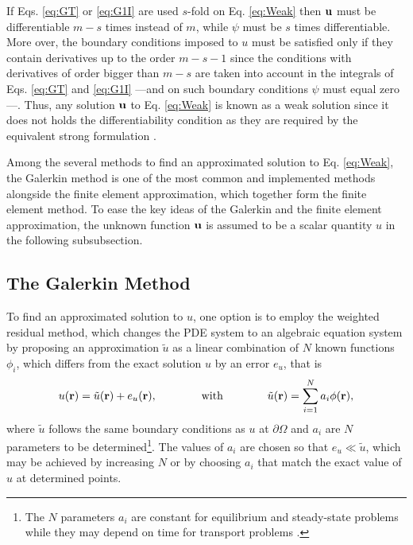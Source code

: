 %
If  Eqs. \eqref{eq:GT} or \eqref{eq:G1I} are used $s$-fold on Eq. \eqref{eq:Weak} then $\vb{u}$ must be differentiable $m-s$ times instead of $m$, while $\psi$ must be $s$ times differentiable. More over, the boundary conditions imposed to $u$ must be satisfied only if they contain  derivatives up to the order $m-s-1$ since the conditions with derivatives of order bigger than $m-s$ are taken into account in the integrals of Eqs. \eqref{eq:GT} and \eqref{eq:G1I} ---and on such boundary conditions $\psi$ must equal zero---. Thus, any solution $\vb{u}$ to Eq. \eqref{eq:Weak} is known as a weak solution  since it does not holds the differentiability condition as they are required by the equivalent strong formulation \cite{dhatt_finite_2012}.

Among the several methods to find an approximated solution to Eq. \eqref{eq:Weak}, the Galerkin method is one of the most common and implemented methods alongside the finite element approximation, which together form the finite element method. To ease the key ideas of the Galerkin and the finite element approximation, the unknown function $\vb{u}$ is assumed to be a scalar quantity $u$ in the following subsubsection.

    \subsection{The Galerkin Method}

    To find an approximated solution to $u$, one option is to employ the weighted residual method, which changes the PDE system to an algebraic equation system by proposing an approximation  $\tilde{u}$ as a linear combination of $N$ known functions  $\phi_i$, which differs from the exact solution $u$ by an error $e_{u}$, that is \cite{dhatt_finite_2012,larson_finite_2013,fletcher_computational_1984}
     \begin{align}
        {u}(\vb{r}) = \tilde{{u}}(\vb{r}) + e_{{u}}(\vb{r}),
            \qquad\qquad
            \text{with}
            \qquad\qquad
        \tilde{{u}}(\vb{r}) = \sum_{i = 1}^{N} {a}_i\phi(\vb{r}),
     \label{eq:uapprox}
     \end{align}
     where $\tilde{{u}}$ follows the same boundary conditions as ${u}$ at $\partial\Omega$ and ${a}_i$ are $N$ parameters to be determined\footnote{The $N$ parameters ${a}_i$ are constant for equilibrium and steady-state problems while they may depend on time for transport problems \cite{dhatt_finite_2012}.}. The values of ${a}_i$ are chosen so that $e_{{u}}\ll  \tilde{u} $, which may be achieved by increasing $N$ or by choosing ${a}_i$ that match the exact value of ${u}$ at determined points.

